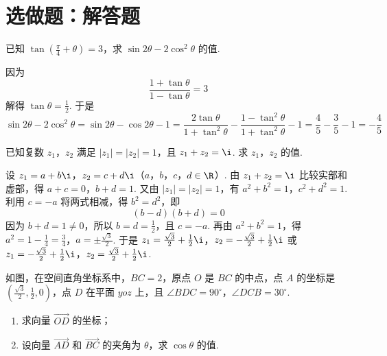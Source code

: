 \section{选做题：解答题}

\begin{problem}[A]
已知 \(\tan\left(\frac{\pi}{4}+\theta\right)=3\)，求 \(\sin2\theta-2\cos^{2}\theta\) 的值.
\end{problem}

\begin{solution}
因为
\[
\frac{1+\tan\theta}{1-\tan\theta}=3
\]
解得 \(\tan\theta=\frac{1}{2}\). 于是
\[
\sin2\theta-2\cos^2\theta
=\sin2\theta-\cos2\theta-1
=\frac{2\tan\theta}{1+\tan^2\theta}-\frac{1-\tan^2\theta}{1+\tan^2\theta}-1
=\frac{4}{5}-\frac{3}{5}-1=-\frac{4}{5}
\]
\end{solution}

\begin{problem}[A]
已知复数 \(z_1\)，\(z_2\) 满足 \(|z_1|=|z_2|=1\)，且 \(z_1+z_2=\i\). 求 \(z_1\)，\(z_2\) 的值.
\end{problem}

\begin{solution}
设 \(z_1=a+b\i\)，\(z_2=c+d\i\)（\(a\)，\(b\)，\(c\)，\(d\in\R\)）. 由
\(z_1+z_2=\i\) 比较实部和虚部，得
\(a+c=0\)，\(b+d=1\).
又由 \(|z_1|=|z_2|=1\)，有
\(a^2+b^2=1\)，\(c^2+d^2=1\).
利用 \(c=-a\) 将两式相减，得 \(b^2=d^2\)，即
\[
(b-d)(b+d)=0
\]
因为 \(b+d=1\ne0\)，所以 \(b=d=\frac{1}{2}\)，且 \(c=-a\). 再由
\(a^2+b^2=1\)，得
\(a^2=1-\frac{1}{4}=\frac{3}{4}\)，\(a=\pm\frac{\sqrt{3}}{2}\).
于是
\(z_1=\frac{\sqrt{3}}{2}+\frac{1}{2}\i\)，\(z_2=-\frac{\sqrt{3}}{2}+\frac{1}{2}\i\)
或
\(z_1=-\frac{\sqrt{3}}{2}+\frac{1}{2}\i\)，\(z_2=\frac{\sqrt{3}}{2}+\frac{1}{2}\i\).
\end{solution}

\setcounter{probnum}{20}
\begin{problem}[B]
如图，在空间直角坐标系中，\(BC=2\)，原点 \(O\) 是 \(BC\) 的中点，点 \(A\) 的坐标是 \(\left(\frac{\sqrt{3}}{2},\frac{1}{2},0\right)\)，点 \(D\) 在平面 \(yoz\) 上，且 \(\angle BDC=90^\circ\)，\(\angle DCB=30^\circ\).

\begin{enumerate}
\item 求向量 \(\overrightarrow{OD}\) 的坐标；
\item 设向量 \(\overrightarrow{AD}\) 和 \(\overrightarrow{BC}\) 的夹角为 \(\theta\)，求 \(\cos\theta\) 的值.
\end{enumerate}

\end{problem}

